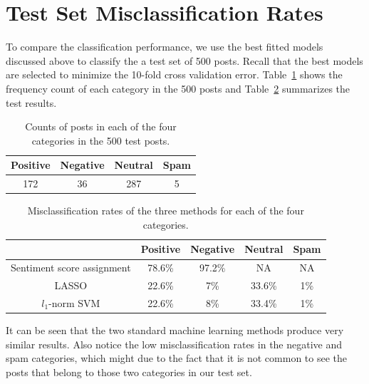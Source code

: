 \documentclass[11pt]{article}
\newcommand{\1}[1]{{\mathbf 1}\left\{#1\right\}}        %
\begin{document}
\section{Test Set Misclassification Rates}

To compare the classification performance, we use the best fitted models discussed above to classify the a test set of 500 posts. Recall that the best models are selected to minimize the 10-fold cross validation error. Table~\ref{tb:testcounts} shows the frequency count of each category in the 500 posts and Table~\ref{tb:testmis} summarizes the test results. 

\begin{table}[!h]
\caption{Counts of posts in each of the four categories in the 500 test posts.}
\begin{center}
\begin{tabular}{|c|c|c|c|}
\hline
Positive & Negative & Neutral & Spam \\ \hline
 172      & 36   &   287   &  5 \\ \hline
\end{tabular}
\end{center}
\label{tb:testcounts}
\end{table}%


\begin{table}[!h]
\caption{Misclassification rates of the three methods for each of the four categories.}
\begin{center}
\begin{tabular}{|c|c|c|c|c|}
\hline
              &  			Positive & Negative & Neutral & Spam  \\ \hline
Sentiment score assignment & 	78.6\%		&	97.2\%	&  	NA	& NA  \\ \hline
LASSO               & 	22.6\%   &   7\%   &   33.6\%    &    1\% \\ \hline
$l_1$-norm SVM       &       22.6\%  &    8\%    &  33.4\%   &     1\% \\ \hline
\end{tabular}
\end{center}
\label{tb:testmis}
\end{table}%



It can be seen that the two standard machine learning methods produce very similar results. Also notice the low misclassification rates in the negative and spam categories, which might due to the fact that it is not common to see the posts that belong to those two categories in our test set.
\end{document}
